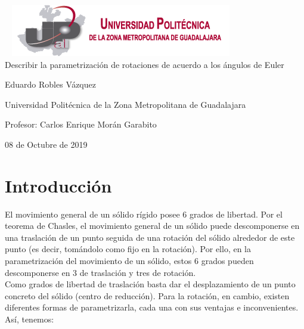 \documentclass[11pt,a4paper,oldfontcommands,oneside]{memoir}
\begin{document}
%
%
\thispagestyle{empty}

{%
\sffamily
\centering
\Large

~\vspace{\fill}
\includegraphics[scale=1]{logo.png} \\
{\huge 
\vspace{4cm}
Describir la parametrización de rotaciones de acuerdo a los ángulos de Euler
}
\vspace{2.5cm}

{\LARGE
Eduardo Robles Vázquez
}

\vspace{2.5cm}

Universidad Politécnica de la Zona Metropolitana de Guadalajara

\vspace{3.5cm}

Profesor: Carlos Enrique Morán Garabito

\vspace{\fill}

08 de Octubre de 2019

}%

\vspace{.5cm}
\hfill\break




\tableofcontents*

\clearpage

\chapter{Introducción}
El movimiento general de un sólido rígido posee 6 grados de libertad.
Por el teorema de Chasles, el movimiento general de un sólido puede descomponerse en una traslación de un punto seguida de una rotación del sólido alrededor de este punto (es decir, tomándolo como fijo en la rotación). Por ello, en la parametrización del movimiento de un sólido, estos 6 grados pueden descomponerse en 3 de traslación y tres de rotación.\\
Como grados de libertad de traslación basta dar el desplazamiento de un punto concreto del sólido (centro de reducción).
Para la rotación, en cambio, existen diferentes formas de parametrizarla, cada una con sus ventajas e inconvenientes. Así, tenemos:\\
\end{document}

